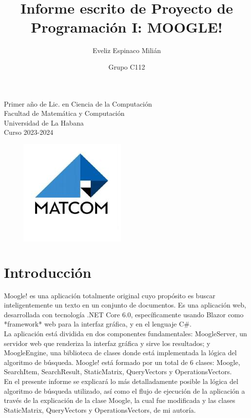 \documentclass[12pt, letterpaper]{article}
\title{\textbf{Informe escrito de Proyecto de Programación I: MOOGLE!} }
\author{Eveliz Espinaco Milián}
\date{Grupo C112}
\begin{document}
\thispagestyle{empty} 
\maketitle

\vspace{4cm}
\begin{center}
    Primer año de Lic. en Ciencia de la Computación \\ Facultad de Matemática y Computación \\ Universidad de La Habana \\ Curso 2023-2024
\end{center}

\begin{figure}[h]
    \centering
    \includegraphics[scale= 0.53]{R.jpg}
\end{figure}

\newpage

\tableofcontents
\newpage

\section{Introducción}

Moogle! es una aplicación totalmente original cuyo propósito es buscar inteligentemente un texto en un conjunto de documentos. Es una aplicación web, desarrollada con tecnología .NET Core 6.0, específicamente usando Blazor como *framework* web para la interfaz gráfica, y en el lenguaje C\#. \\ 
La aplicación está dividida en dos componentes fundamentales: MoogleServer, un servidor web que renderiza la interfaz gráfica y sirve los resultados; y MoogleEngine, una biblioteca de clases donde está implementada la lógica del algoritmo de búsqueda. Moogle! está formado por un total de 6 clases: Moogle, SearchItem, SearchResult, StaticMatrix, QueryVectors y OperationsVectors. \\
En el presente informe se explicará lo más detalladamente posible la lógica del algoritmo de búsqueda utilizado, así como el flujo de ejecución de la aplicación a través de la explicación de la clase Moogle, la cual fue modificada y las clases StaticMatrix, QueryVectors y OperationsVectors, de mi autoría.
\end{document}
